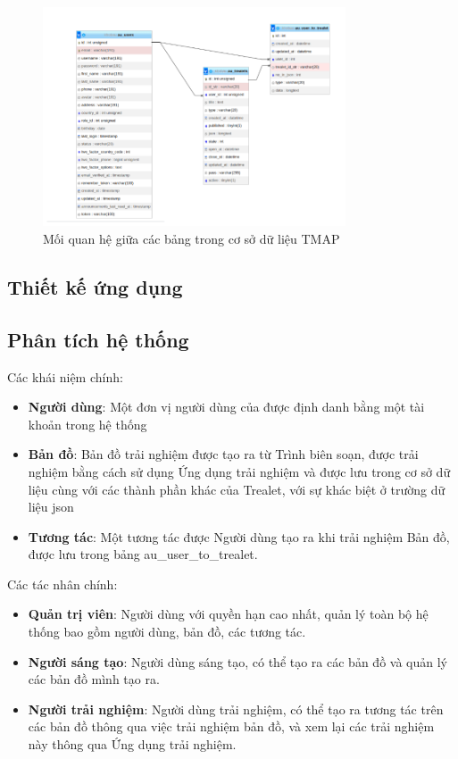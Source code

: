 \begin{figure}[h]
    \centering
    \includegraphics[width=0.8\textwidth]{figures/erd.png}
    \caption{Mối quan hệ giữa các bảng trong cơ sở dữ liệu TMAP}
    \label{fig:tmap_database}
\end{figure}

\subsection{Thiết kế ứng dụng}
\subsection*{Phân tích hệ thống}
Các khái niệm chính:
\begin{itemize}
    \item \textbf{Người dùng}: Một đơn vị người dùng của được định danh bằng một tài khoản trong
hệ thống
    \item \textbf{Bản đồ}: Bản đồ trải nghiệm được tạo ra từ Trình biên soạn, được trải nghiệm
bằng cách sử dụng Ứng dụng trải nghiệm và được lưu trong cơ sở dữ liệu cùng với
các thành phần khác của Trealet, với sự khác biệt ở trường dữ liệu json
    \item \textbf{Tương tác}: Một tương tác được Người dùng tạo ra khi trải nghiệm Bản đồ, được lưu
trong bảng au\_user\_to\_trealet.
\end{itemize}
Các tác nhân chính:
\begin{itemize}
    \item \textbf{Quản trị viên}: Người dùng với quyền hạn cao nhất, quản lý toàn bộ hệ thống bao gồm người dùng, bản đồ, các tương tác.
    \item \textbf{Người sáng tạo}: Người dùng sáng tạo, có thể tạo ra các bản đồ và quản lý các bản đồ mình tạo ra.
    \item \textbf{Người trải nghiệm}: Người dùng trải nghiệm, có thể tạo ra tương tác trên các bản đồ thông qua việc trải nghiệm bản đồ, và xem lại các trải nghiệm này thông qua Ứng dụng trải nghiệm.
\end{itemize}

